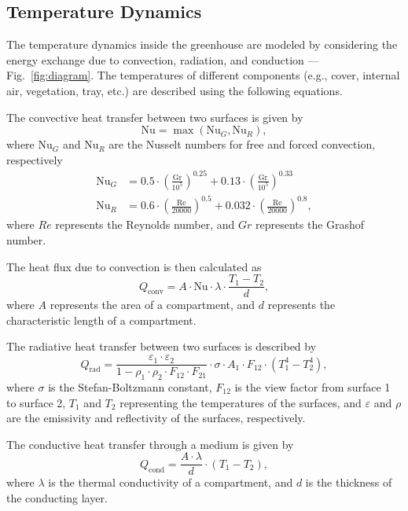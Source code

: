 \documentclass[conference]{IEEEtran}
\begin{document}
\subsection{Temperature Dynamics}\label{subsec:temperature}

The temperature dynamics inside the greenhouse are modeled by considering the energy exchange due to convection, radiation, and conduction --- Fig.~\ref{fig:diagram}. The temperatures of different components (e.g., cover, internal air, vegetation, tray, etc.) are described using the following equations.

The convective heat transfer between two surfaces is given by
\begin{equation}
    \text{Nu} = \max \left( \text{Nu}_G, \text{Nu}_R \right),
\end{equation}
where \(\text{Nu}_G\) and \(\text{Nu}_R\) are the Nusselt numbers for free and forced convection, respectively
\begin{align}
    \text{Nu}_G & = 0.5 \cdot \left(\frac{\text{Gr}}{10^5}\right)^{0.25} + 0.13 \cdot \left(\frac{\text{Gr}}{10^5}\right)^{0.33}   \\
    \text{Nu}_R & = 0.6 \cdot \left(\frac{\text{Re}}{20000}\right)^{0.5} + 0.032 \cdot \left(\frac{\text{Re}}{20000}\right)^{0.8},
\end{align}
where \(Re\) represents the Reynolds number, and \(Gr\) represents the Grashof number.

The heat flux due to convection is then calculated as
\begin{equation}
    Q_{\text{conv}} = A \cdot \text{Nu} \cdot \lambda \cdot \frac{T_1 - T_2}{d},
\end{equation}
where \(A\) represents the area of a compartment, and \(d\) represents the characteristic length of a compartment.

The radiative heat transfer between two surfaces is described by
\begin{equation}
    Q_{\text{rad}} = \frac{\varepsilon_1 \cdot \varepsilon_2}{1 - \rho_1 \cdot \rho_2 \cdot F_{12} \cdot F_{21}} \cdot \sigma \cdot A_1 \cdot F_{12} \cdot \left( T_1^4 - T_2^4 \right),
\end{equation}
where \(\sigma \) is the Stefan-Boltzmann constant, \(F_{12}\) is the view factor from surface 1 to surface 2, \(T_1\) and \(T_2\) representing the temperatures of the surfaces, and \(\varepsilon \) and \(\rho \) are the emissivity and reflectivity of the surfaces, respectively.

The conductive heat transfer through a medium is given by
\begin{equation}
    Q_{\text{cond}} = \frac{A \cdot \lambda}{d} \cdot (T_1 - T_2),
\end{equation}
where \(\lambda \) is the thermal conductivity of a compartment, and \(d\) is the thickness of the conducting layer.
\end{document}
